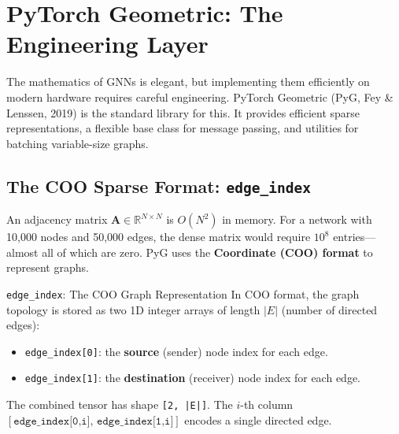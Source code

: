 \section{PyTorch Geometric: The Engineering Layer}

The mathematics of GNNs is elegant, but implementing them efficiently on modern hardware requires careful engineering. PyTorch Geometric (PyG, Fey \& Lenssen, 2019) is the standard library for this. It provides efficient sparse representations, a flexible base class for message passing, and utilities for batching variable-size graphs.

\subsection{The COO Sparse Format: \texttt{edge\_index}}

An adjacency matrix $\mathbf{A} \in \mathbb{R}^{N \times N}$ is $O(N^2)$ in memory. For a network with 10,000 nodes and 50,000 edges, the dense matrix would require $10^8$ entries---almost all of which are zero. PyG uses the \textbf{Coordinate (COO) format} to represent graphs.

\begin{mathbox}{\texttt{edge\_index}: The COO Graph Representation}
In COO format, the graph topology is stored as two 1D integer arrays of length $|E|$ (number of directed edges):
\begin{itemize}[noitemsep]
    \item \texttt{edge\_index[0]}: the \textbf{source} (sender) node index for each edge.
    \item \texttt{edge\_index[1]}: the \textbf{destination} (receiver) node index for each edge.
\end{itemize}
The combined tensor has shape \texttt{[2, |E|]}. The $i$-th column $[\texttt{edge\_index[0,i]},\, \texttt{edge\_index[1,i]}]$ encodes a single directed edge.
\end{mathbox}

